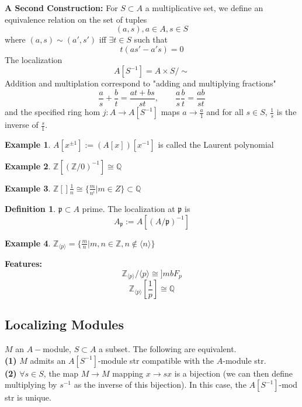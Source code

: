 \documentclass{article}
\theoremstyle{definition}
\newtheorem{example}{Example}[section]
\theoremstyle{definition}
\newtheorem{definition}{Definition}[section]
\theoremstyle{remark}
\newcommand{\Z}{\mathbb{Z}}
\newcommand{\Q}{\mathbb{Q}}
\newcommand{\mk}[1]{\mathfrak{#1}}
\begin{document}
\textbf{A Second Construction: } For $S \subset A$ a multiplicative set, we define an equivalence relation on the set of tuples 
\[(a,s), a \in A, s \in S\]
where $(a,s) \sim (a',s')$ iff $\exists t \in S$ such that 
\[t(as' - a's) = 0\]
\noindent The localization
\[A[S^{-1}] = A \times S/ \sim\]
Addition and multiplation correspond to "adding and multiplying fractions"
\[ \frac{a}{s} + \frac{b}{t} = \frac{at + bs}{st}, \quad \quad \frac{a}{s} \frac{b}{t} = \frac{ab}{st}\]
and the specified ring hom $j:A \to A[S^{-1}]$ maps $a \to \frac{a}{1}$
and for all $s \in S$, $ \frac{1}{s}$ is the inverse of $ \frac{s}{1}$.

\begin{example}
	\indent $A[x^{\pm 1}] := (A[x])[x^{-1}]$ is called the Laurent polynomial
\end{example}

\begin{example}
	$\Z[(\Z/0)^{-1}] \cong \Q$
\end{example}

\begin{example}
	$\Z[] \frac{1}{n} \cong \{ \frac{m}{n^i} | m \in Z\} \subset \Q$

\end{example}

\begin{definition}
	$\mk{p} \subset A$ prime. The localization at $\mk{p}$ is 
	\[ A_{\mk{p}} := A[(A/\mk{p})^{-1}]\]
\end{definition}

\begin{example} $\Z_{\langle p\rangle} = \{ \frac{m}{n} | m,n \in \Z, n \notin \langle n\rangle\}$
\end{example}

\textbf{Features:} 
\[\Z_{\langle p\rangle}/\langle p\rangle \cong ]mb{F}_p\]
\[\Z_{\langle p\rangle}[ \frac{1}{p}] \cong \Q\]
\subsection{Localizing Modules}
$M$ an $A-$module, $S \subset A$ a subset.
The following are equivalent.\\
\textbf{(1)} $M$ admits an $A[S^{-1}]$-module str compatible with the $A$-module str.\\
\textbf{(2)} $\forall s \in S$, the map $M \to M$ mapping $x \to sx$ is a bijection (we can then define multiplying by $s^{-1}$ as the inverse of this bijection).
In this case, the $A[S^{-1}]$-mod str is unique.\\
\end{document}
